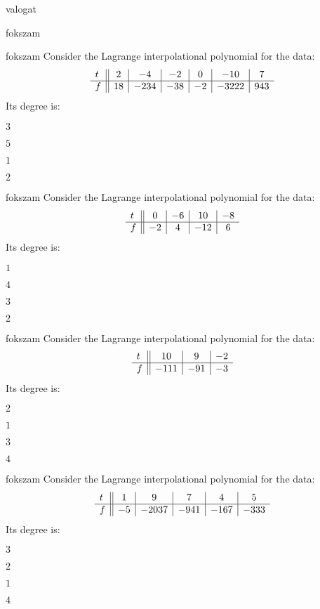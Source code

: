 \documentclass[12pt]{article}
\begin{document}
\begin{quiz}{valogat}
\begin{multi}{fokszam}
\end{multi}
\begin{multi}{fokszam}
Consider the Lagrange interpolational polynomial for the data:
$$\begin{array}{l ||c|c|c|c|c|c}t&2&-4&-2&0&-10&7\\ \hline f&18&-234&-38&-2&-3222&943 \\ \end{array}$$
Its degree is:
\item* $ 3 $
\item  $ 5 $
\item  $ 1 $
\item  $ 2 $
\end{multi}
\begin{multi}{fokszam}
Consider the Lagrange interpolational polynomial for the data:
$$\begin{array}{l ||c|c|c|c}t&0&-6&10&-8\\ \hline f&-2&4&-12&6 \\ \end{array}$$
Its degree is:
\item* $ 1 $
\item  $ 4 $
\item  $ 3 $
\item  $ 2 $
\end{multi}
\begin{multi}{fokszam}
Consider the Lagrange interpolational polynomial for the data:
$$\begin{array}{l ||c|c|c}t&10&9&-2\\ \hline f&-111&-91&-3 \\ \end{array}$$
Its degree is:
\item* $ 2 $
\item  $ 1 $
\item  $ 3 $
\item  $ 4 $
\end{multi}
\begin{multi}{fokszam}
Consider the Lagrange interpolational polynomial for the data:
$$\begin{array}{l ||c|c|c|c|c}t&1&9&7&4&5\\ \hline f&-5&-2037&-941&-167&-333 \\ \end{array}$$
Its degree is:
\item* $ 3 $
\item  $ 2 $
\item  $ 1 $
\item  $ 4 $

\end{multi}
\end{quiz}
\end{document}
